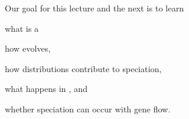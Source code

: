 \documentclass[t]{beamer}
\begin{document}

\begin{frame}{Our goal for this lecture and the next is to learn}
	
	\hangpara what is a 

	\hangpara how  evolves,
	
	\hangpara how  distributions contribute to speciation,
	
	\hangpara what happens in , and
	
	
	\hangpara whether speciation can occur with gene flow.
	
\end{frame}
%
%
%
%
%
%
%
%
%
%		
%
%	
%		
%
%
%
%
%
\end{document}
